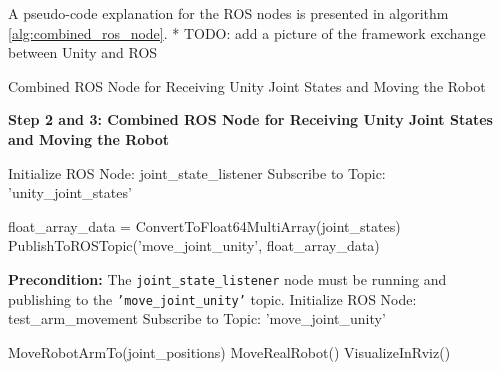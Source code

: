     


    A pseudo-code explanation for the \ac{ROS} nodes is presented in algorithm \ref{alg:combined_ros_node}.
    * TODO: add a picture of the framework exchange between Unity and ROS 


    \begin{algorithm}
        \caption{Combined ROS Node for Receiving Unity Joint States and Moving the Robot}\label{alg:combined_ros_node}
        \begin{algorithmic}[1]
            \State \textbf{Step 2 and 3: Combined ROS Node for Receiving Unity Joint States and Moving the Robot}
            
            \State Initialize ROS Node: joint\_state\_listener
            \State Subscribe to Topic: 'unity\_joint\_states'
            
                \State float\_array\_data = ConvertToFloat64MultiArray(joint\_states)
                \State PublishToROSTopic('move\_joint\_unity', float\_array\_data)
            \EndWhile
            
            \State \textbf{Precondition:} The \texttt{joint\_state\_listener} node must be running and publishing to the \texttt{'move\_joint\_unity'} topic.
            \State Initialize ROS Node: test\_arm\_movement
            \State Subscribe to Topic: 'move\_joint\_unity'
            
                \State MoveRobotArmTo(joint\_positions)
                    \State MoveRealRobot()
                \Else
                    \State VisualizeInRviz()
                \EndIf
            \EndWhile
        \end{algorithmic}
    \end{algorithm}
    
